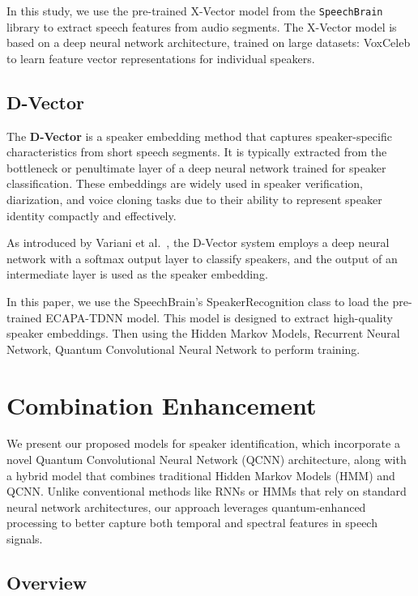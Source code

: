 \documentclass[conference]{IEEEtran}
\begin{document}
In this study, we use the pre-trained X-Vector model from the \texttt{SpeechBrain}
library to extract speech features from audio segments. The X-Vector model
is based on a deep neural network architecture, trained on large
datasets: VoxCeleb to learn feature vector representations
for individual speakers.




\subsection{D-Vector}

The \textbf{D-Vector} is a speaker embedding method that captures speaker-specific
characteristics from short speech segments. It is typically extracted from the
bottleneck or penultimate layer of a deep neural network trained for speaker
classification. These embeddings are widely used in speaker verification,
diarization, and voice cloning tasks due to their ability to represent speaker
identity compactly and effectively.

As introduced by Variani et al.~\cite{variani2014deep}, the D-Vector system employs
a deep neural network with a softmax output layer to classify speakers, and the
output of an intermediate layer is used as the speaker embedding.


In this paper, we use the SpeechBrain's SpeakerRecognition class to load the pre-trained
ECAPA-TDNN model. This model is designed to extract high-quality speaker embeddings.
Then using the Hidden Markov Models, Recurrent Neural Network,
Quantum Convolutional Neural Network to perform training.










\section{Combination Enhancement}

We present our proposed models for speaker identification, which incorporate a novel Quantum Convolutional Neural Network (QCNN) architecture, along with a hybrid model that combines traditional Hidden Markov Models (HMM) and QCNN. Unlike conventional methods like RNNs or HMMs that rely on standard neural network architectures, our approach leverages quantum-enhanced processing to better capture both temporal and spectral features in speech signals.

\subsection{Overview}
\end{document}
